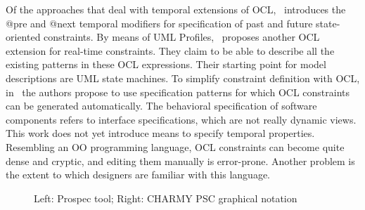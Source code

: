\documentclass[letter]{llncs}
\begin{document}
Of the approaches that deal with temporal extensions of OCL,~\cite{Ziemann02anextension}
introduces the @pre and @next temporal modifiers for specification of past and future state-oriented constraints. 
By means of UML Profiles,~\cite{Flake03formalsemantics}
proposes another OCL extension for real-time constraints. They claim to be able to describe all the existing 
patterns in these OCL expressions. Their starting point for model descriptions are UML state machines.
To simplify constraint definition with OCL, in~\cite{Ackermann:2006:LOS:2135315.2135339} the authors 
propose to use specification patterns for which OCL constraints can be generated automatically.
The behavioral specification of software components refers to interface specifications,
which are not really dynamic views. This work does not yet introduce means to specify temporal properties.
Resembling an OO programming language, OCL constraints can become quite dense and cryptic, and editing 
them manually is error-prone. Another problem is the extent to which designers are familiar with this language.
\begin{figure}[t!]
  \centering
  \hfill
  \caption{Left: Prospec tool; Right: CHARMY PSC graphical notation}
\end{figure}
\end{document}
